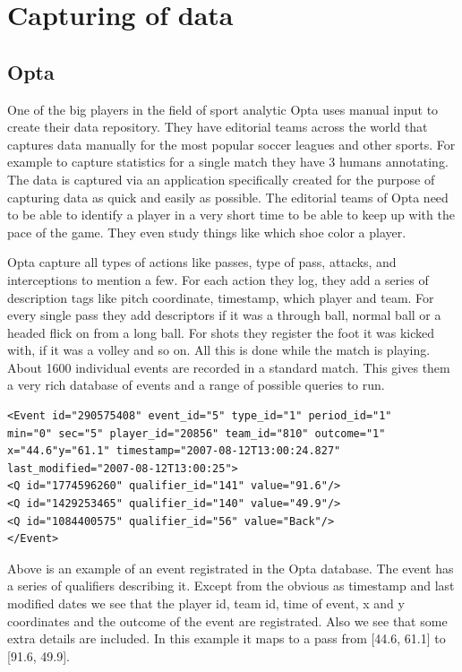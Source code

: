 \section{Capturing of data}
\subsection{Opta}

One of the big players in the field of sport analytic Opta uses manual input to create their data repository. They have editorial teams across the world that captures data manually for the most popular soccer leagues and other sports. For example to capture statistics for a single match they have 3 humans annotating. The data is captured via an application specifically created for the purpose of capturing data as quick and easily as possible. The editorial teams of Opta need to be able to identify a player in a very short time to be able to keep up with the pace of the game. They even study things like which shoe color a player.

Opta capture all types of actions like passes, type of pass, attacks, and interceptions to mention a few. For each action they log, they add a series of description tags like pitch coordinate, timestamp, which player and team. For every single pass they add descriptors if it was a through ball, normal ball or a headed flick on from a long ball. For shots they register the foot it was kicked with, if it was a volley and so on. All this is done while the match is playing. About 1600 individual events are recorded in a standard match. This gives them a very rich database of events and a range of possible queries to run. 

\begin{lstlisting}
<Event id="290575408" event_id="5" type_id="1" period_id="1" 
min="0" sec="5" player_id="20856" team_id="810" outcome="1" 
x="44.6"y="61.1" timestamp="2007-08-12T13:00:24.827" 
last_modified="2007-08-12T13:00:25">
<Q id="1774596260" qualifier_id="141" value="91.6"/>
<Q id="1429253465" qualifier_id="140" value="49.9"/>
<Q id="1084400575" qualifier_id="56" value="Back"/>
</Event>
\end{lstlisting}

Above is an example of an event registrated in the Opta database. The event has a series of qualifiers describing it. Except from the obvious as timestamp and last modified dates we see that the player id, team id, time of event, x and y coordinates and the outcome of the event are registrated. Also we see that some extra details are included. In this example it maps to a pass from [44.6, 61.1] to [91.6, 49.9]. 

